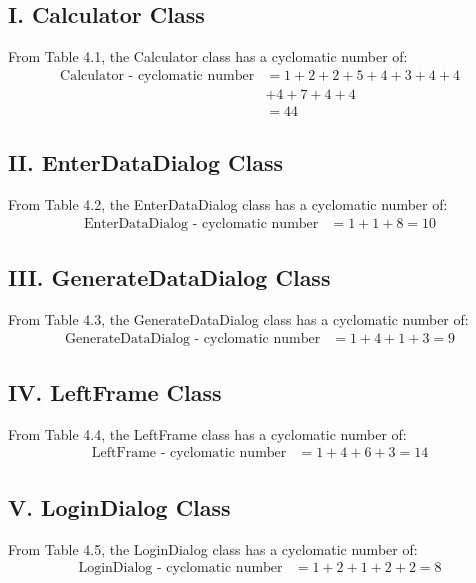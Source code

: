\documentclass[english,12pt,a4paper]{report}
\begin{document}
	        \subsection*{I. Calculator Class}
	
	From Table 4.1, the Calculator class has a cyclomatic number of:
	\begin{align*}
		\text{Calculator - cyclomatic number} &= 1 + 2 + 2 + 5 + 4 + 3 + 4 + 4 \\
		&+ 4 + 7 + 4 + 4 \\
		&= 44
	\end{align*} 
	
	\subsection*{II. EnterDataDialog Class}
	
	From Table 4.2, the EnterDataDialog class has a cyclomatic number of:
	\begin{align*}
		\text{EnterDataDialog - cyclomatic number} &= 1 + 1 + 8 = 10
	\end{align*} 
	
	\subsection*{III. GenerateDataDialog Class}
	
	From Table 4.3, the GenerateDataDialog class has a cyclomatic number of:
	\begin{align*}
		\text{GenerateDataDialog - cyclomatic number} &= 1 + 4 + 1 + 3 = 9
	\end{align*} 
	
	\subsection*{IV. LeftFrame Class}
	
	From Table 4.4, the LeftFrame class has a cyclomatic number of:
	\begin{align*}
		\text{LeftFrame - cyclomatic number} &= 1 + 4 + 6 + 3 = 14
	\end{align*} 
	
	\subsection*{V. LoginDialog Class}
	
	From Table 4.5, the LoginDialog class has a cyclomatic number of:
	\begin{align*}
		\text{LoginDialog - cyclomatic number} &= 1 + 2 + 1 + 2 + 2 = 8
	\end{align*} 
	
\end{document}
